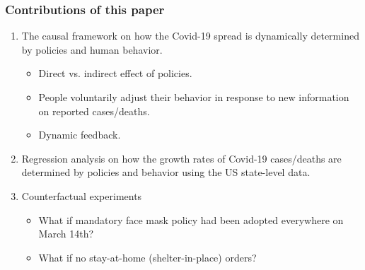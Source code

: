 \documentclass{beamer}
\begin{document}
\begin{frame}
  \frametitle{Contributions of this paper}\vspace{-0.05cm}
 
 \begin{enumerate}
 \item The causal framework on how the Covid-19 spread  is dynamically determined by policies and human behavior.  \smallskip
 \begin{itemize}
 \item Direct  vs. indirect effect of policies.
 \item People voluntarily adjust their behavior in response to new information on reported cases/deaths.
 \item Dynamic feedback. \smallskip
 \end{itemize}
 \item Regression analysis on how the growth rates of  Covid-19 cases/deaths are determined by policies and behavior using the US state-level data.  \smallskip
 \item Counterfactual experiments \smallskip
 \begin{itemize}
 \item What if mandatory face mask policy had been adopted everywhere on March 14th? \smallskip
 \item What if no stay-at-home (shelter-in-place) orders?
 \end{itemize}
 \end{enumerate}

\end{frame}


 


\end{document}
